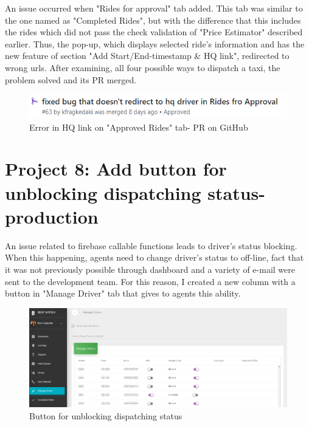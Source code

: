 An issue occurred when "Rides for approval" tab added. This tab was similar to the one named as "Completed Rides", but with the difference that this includes the rides which did not pass the check validation of "Price Estimator" described earlier. Thus, the pop-up, which displays selected ride's information and has the new feature of section "Add Start/End-timestamp \& HQ link", redirected to wrong urls. After examining, all four possible ways to dispatch a taxi, the problem solved and its PR merged.

\begin{figure}[H]
	\begin{center}
		\includegraphics[scale=0.85]{images/my_projects/fix-doesnot-redirect-to-HQ-PR.png}
	\end{center}
	\caption{Error in HQ link on "Approved Rides" tab- PR on GitHub}
\end{figure}

\section{Project 8: Add button for unblocking dispatching status-production}

An issue related to firebase callable functions leads to driver's status blocking. When this happening, agents need to change driver's status to off-line, fact that it was not previously possible through dashboard and a variety of e-mail were sent to the development team. For this reason, I created a new column with a button in "Manage Driver" tab that gives to agents this ability.

\begin{figure}[H]
	\begin{center}
		\includegraphics[scale=0.2]{images/my_projects/feature-add-add-button.png}
	\end{center}
	\caption{Button for unblocking dispatching status}
\end{figure}

